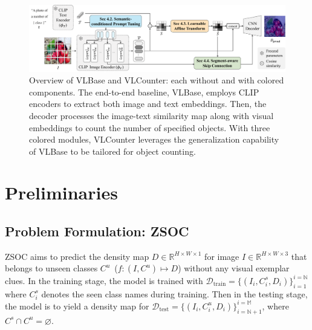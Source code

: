 \begin{figure}[t]
    \begin{center}
    \includegraphics[width=\linewidth]{figs/VLCounter_overview.pdf}
    \end{center}
    \caption{
        Overview of VLBase and VLCounter: each without and with colored components.
        The end-to-end baseline, VLBase, employs CLIP encoders to extract both image and text embeddings. 
        Then, the decoder processes the image-text similarity map along with visual embeddings to count the number of specified objects.
        With three colored modules, VLCounter leverages the generalization capability of VLBase to be tailored for object counting.
    }
    \label{fig:VLCounter_overview}
\end{figure}



\section{Preliminaries}
\subsection{Problem Formulation: ZSOC}
\label{Method:Formulation}
ZSOC aims to predict the density map $D\in \mathbb{R}^{H\times W \times 1}$ for image $I\in \mathbb{R}^{H\times W \times3}$ that belongs to unseen classes $C^u$~($f:(I, C^u)\mapsto D$) without any visual exemplar clues.
In the training stage, the model is trained with $\mathcal{D}_\text{train} = \{(I_i, C^s_i, D_i)\}_{i=1}^{i=\mathbb{N}}$ where $C^s_i$ denotes the seen class names during training.
Then in the testing stage, the model is to yield a density map for $\mathcal{D}_\text{test}=\{(I_i, C^u_i, D_i)\}_{i=\mathbb{N}+1}^{i=\mathbb{M}}$, where $C^s \cap C^u=\varnothing$.


